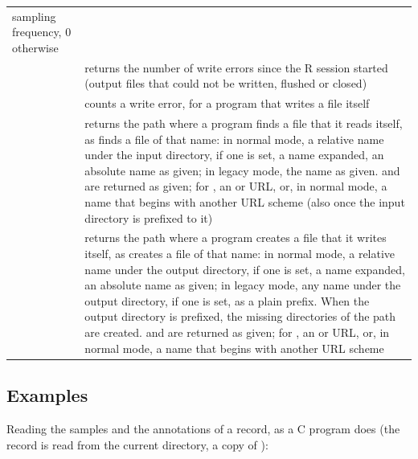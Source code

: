\begin{xltabular}{\linewidth}{@{}lL@{}}
  sampling frequency, 0 otherwise \\
 & returns the number of write errors since the R session
  started (output files that could not be written, flushed or closed) \\
 & counts a write error, for a program that writes a
  file itself \\
 & returns the path where a program finds a file that it
  reads itself, as  finds a file of that name: in normal mode, a
  relative name under the input directory, if one is set, a \code{\textasciitilde} name
  expanded, an absolute name as given; in legacy mode, the name as given.  and
   are returned as given;  for , an  or
   URL, or, in normal mode, a name that begins with another URL scheme
  (also once the input directory is prefixed to it) \\
 & returns the path where a program creates a file that
  it writes itself, as  creates a file of that name: in normal mode, a
  relative name under the output directory, if one is set, a \code{\textasciitilde} name
  expanded, an absolute name as given; in legacy mode, any name under the output
  directory, if one is set, as a plain prefix. When the output directory is prefixed,
  the missing directories of the path are created.  and  are returned
  as given;  for , an  or  URL, or,
  in normal mode, a name that begins with another URL scheme \\
\end{xltabular}

\subsection{Examples}

Reading the samples and the annotations of a record, as a C program does (the record
 is read from the current directory, a copy of ):

